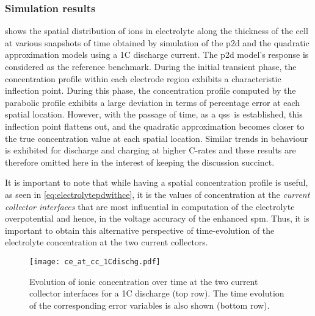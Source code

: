 \subsubsection*{Simulation results}\label{subsubsec:simresultsbaselinequad}

 shows  the spatial distribution of   ions
in electrolyte  along the  thickness of  the cell at  various snapshots  of time
obtained by simulation  of the \gls{p2d} and the  quadratic approximation models
using a  1C discharge current. The  \gls{p2d} model's response is  considered as
the reference benchmark.  During the initial transient  phase, the concentration
profile within each electrode region exhibits a characteristic inflection point.
During this phase,  the concentration profile computed by  the parabolic profile
exhibits  a  large deviation  in  terms  of  percentage  error at  each  spatial
location. However, with the passage of time, as a \gls{qss}~is established, this
inflection point flattens out, and the quadratic approximation becomes closer to
the  true  concentration value  at  each  spatial  location. Similar  trends  in
behaviour is  exhibited for discharge and  charging at higher C-rates  and these
results are  therefore omitted here  in the  interest of keeping  the discussion
succinct.

It  is important  to  note that  while having  a  spatial concentration  profile
is  useful,  as  seen  in \cref{eq:electrolytepdwithce}, it  is  the  values  of
concentration  at   the  \emph{current  collector  interfaces}   that  are  most
influential in  computation of the  electrolyte overpotential and hence,  in the
voltage accuracy of the enhanced \gls{spm}. Thus, it is important to obtain this
alternative perspective  of time-evolution  of the electrolyte  concentration at
the two current collectors.

\begin{figure}[!htbp]
    \centering
    \texttt{[image: ce\_at\_cc\_1Cdischg.pdf]}
    \caption[Ionic concentrations at current collector
    interfaces over time for 1C discharge]{Evolution of ionic concentration over
        time at the two current collector interfaces for a 1C discharge (top
        row). The time evolution of the corresponding error variables is also
    shown (bottom row).}
    \label{fig:temporalcequadratic}
\end{figure}

